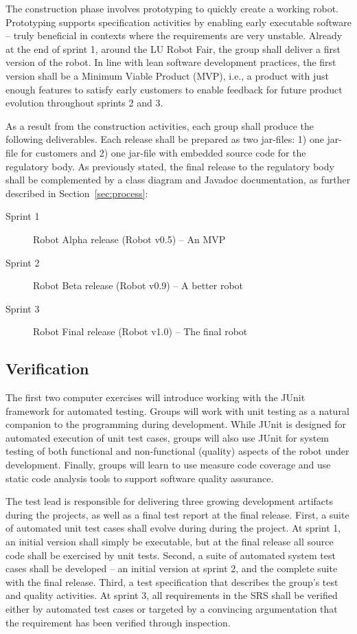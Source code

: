 \documentclass{scrreprt}
\begin{document}
\begin{description}
\end{description}

The construction phase involves prototyping to quickly create a working robot. Prototyping supports specification activities by enabling early executable software -- truly beneficial in contexts where the requirements are very unstable. Already at the end of sprint 1, around the LU Robot Fair, the group shall deliver a first version of the robot. In line with lean software development practices, the first version shall be a Minimum Viable Product (MVP), i.e., a product with just enough features to satisfy early customers to enable feedback for future product evolution throughout sprints 2 and 3. 

As a result from the construction activities, each group shall produce the following deliverables. Each release shall be prepared as two jar-files: 1) one jar-file for customers and 2) one jar-file with embedded source code for the regulatory body. As previously stated, the final release to the regulatory body shall be complemented by a class diagram and Javadoc documentation, as further described in Section~\ref{sec:process}:
\begin{description}
\item[Sprint 1] Robot Alpha release (Robot v0.5) -- An MVP
\item[Sprint 2] Robot Beta release (Robot v0.9) -- A better robot
\item[Sprint 3] Robot Final release (Robot v1.0) -- The final robot
\end{description}

\subsection{Verification}
The first two computer exercises will introduce working with the JUnit framework for automated testing. Groups will work with unit testing as a natural companion to the programming during development. While JUnit is designed for automated execution of unit test cases, groups will also use JUnit for system testing of both functional and non-functional (quality) aspects of the robot under development. Finally, groups will learn to use measure code coverage and use static code analysis tools to support software quality assurance.

The test lead is responsible for delivering three growing development artifacts during the projects, as well as a final test report at the final release. First, a suite of automated unit test cases shall evolve during during the project. At sprint 1, an initial version shall simply be executable, but at the final release all source code shall be exercised by unit tests. Second, a suite of automated system test cases shall be developed -- an initial version at sprint 2, and the complete suite with the final release. Third, a test specification that describes the group's test and quality activities. At sprint 3, all requirements in the SRS shall be verified either by automated test cases or targeted by a convincing argumentation that the requirement has been verified through inspection.
\end{document}
